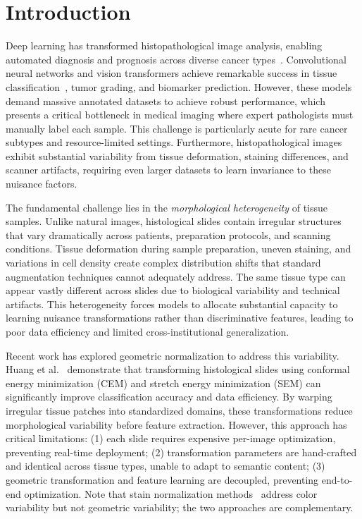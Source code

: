 \documentclass[final,3p,times,review,sort&compress]{elsarticle}
\begin{document}
\linenumbers


\section{Introduction}
\label{sec:introduction}


Deep learning has transformed histopathological image analysis, enabling automated diagnosis and prognosis across diverse cancer types~\cite{huang2024surface,kuntz2021gastrointestinal,chaunzwa2021deep}. Convolutional neural networks and vision transformers achieve remarkable success in tissue classification~\cite{hirra2021breast,wetstein2022deep}, tumor grading, and biomarker prediction. However, these models demand massive annotated datasets to achieve robust performance, which presents a critical bottleneck in medical imaging where expert pathologists must manually label each sample. This challenge is particularly acute for rare cancer subtypes and resource-limited settings. Furthermore, histopathological images exhibit substantial variability from tissue deformation, staining differences, and scanner artifacts, requiring even larger datasets to learn invariance to these nuisance factors.

The fundamental challenge lies in the \textit{morphological heterogeneity} of tissue samples. Unlike natural images, histological slides contain irregular structures that vary dramatically across patients, preparation protocols, and scanning conditions. Tissue deformation during sample preparation, uneven staining, and variations in cell density create complex distribution shifts that standard augmentation techniques cannot adequately address. The same tissue type can appear vastly different across slides due to biological variability and technical artifacts. This heterogeneity forces models to allocate substantial capacity to learning nuisance transformations rather than discriminative features, leading to poor data efficiency and limited cross-institutional generalization.

Recent work has explored geometric normalization to address this variability. Huang et al.~\cite{huang2024surface} demonstrate that transforming histological slides using conformal energy minimization (CEM) and stretch energy minimization (SEM) can significantly improve classification accuracy and data efficiency. By warping irregular tissue patches into standardized domains, these transformations reduce morphological variability before feature extraction. However, this approach has critical limitations: (1) each slide requires expensive per-image optimization, preventing real-time deployment; (2) transformation parameters are hand-crafted and identical across tissue types, unable to adapt to semantic content; (3) geometric transformation and feature learning are decoupled, preventing end-to-end optimization. Note that stain normalization methods~\cite{macenko2009method,shaban2019staingan} address color variability but not geometric variability; the two approaches are complementary.
\end{document}
